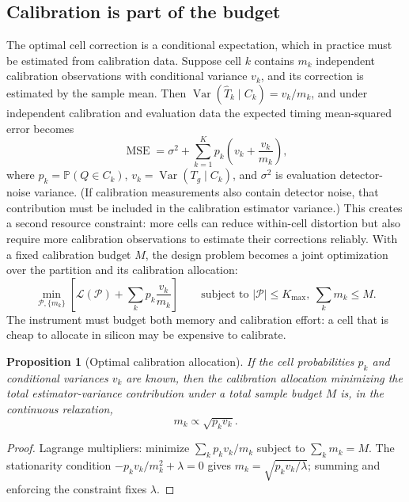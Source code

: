 \documentclass[11pt]{article}
\newtheorem{proposition}[theorem]{Proposition}
\begin{document}
\subsection{Calibration is part of the budget}

The optimal cell correction is a conditional expectation, which in practice must be
estimated from calibration data. Suppose cell $k$ contains $m_k$ independent calibration
observations with conditional variance $v_k$, and its correction is estimated by the
sample mean. Then $\operatorname{Var}(\widehat{T}_k \mid C_k) = v_k/m_k$, and under
independent calibration and evaluation data the expected timing mean-squared error
becomes
\begin{equation}
\boxed{\operatorname{MSE} = \sigma^2 + \sum_{k=1}^{K} p_k \left( v_k + \frac{v_k}{m_k} \right),}
\end{equation}
where $p_k = \mathbb{P}(Q \in C_k)$, $v_k = \operatorname{Var}(T_g \mid C_k)$, and
$\sigma^2$ is evaluation detector-noise variance. (If calibration measurements also
contain detector noise, that contribution must be included in the calibration estimator
variance.) This creates a second resource constraint: more cells can reduce within-cell
distortion but also require more calibration observations to estimate their corrections
reliably. With a fixed calibration budget $M$, the design problem becomes a joint
optimization over the partition and its calibration allocation:
\begin{equation}
\boxed{\min_{\mathcal{P},\{m_k\}} \left[ \mathcal{L}(\mathcal{P}) + \sum_k p_k \frac{v_k}{m_k} \right]}
\qquad\text{subject to } |\mathcal{P}| \le K_{\max},\ \sum_k m_k \le M.
\end{equation}
The instrument must budget both memory and calibration effort: a cell that is cheap to
allocate in silicon may be expensive to calibrate.

\begin{proposition}[Optimal calibration allocation]\label{prop:calibration}
If the cell probabilities $p_k$ and conditional variances $v_k$ are known, then the
calibration allocation minimizing the total estimator-variance contribution under a
total sample budget $M$ is, in the continuous relaxation,
\begin{equation}
\boxed{m_k \propto \sqrt{p_k v_k}.}
\end{equation}
\end{proposition}
\begin{proof}
Lagrange multipliers: minimize $\sum_k p_k v_k / m_k$ subject to $\sum_k m_k = M$. The
stationarity condition $-p_k v_k / m_k^2 + \lambda = 0$ gives
$m_k = \sqrt{p_k v_k/\lambda}$; summing and enforcing the constraint fixes $\lambda$.
\end{proof}
\end{document}

